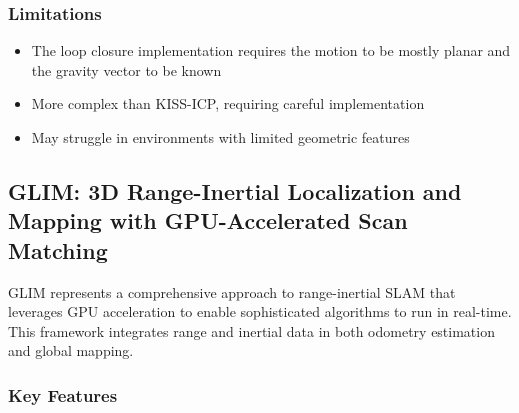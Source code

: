 \documentclass[journal]{IEEEtran}
\begin{document}
\subsubsection{Limitations}

\begin{itemize}
    \item The loop closure implementation requires the motion to be mostly planar and the gravity vector to be known
    \item More complex than KISS-ICP, requiring careful implementation
    \item May struggle in environments with limited geometric features
\end{itemize}

\subsection{GLIM: 3D Range-Inertial Localization and Mapping with GPU-Accelerated Scan Matching}

GLIM represents a comprehensive approach to range-inertial SLAM that leverages GPU acceleration to enable sophisticated algorithms to run in real-time. This framework integrates range and inertial data in both odometry estimation and global mapping.

\subsubsection{Key Features}
\end{document}
